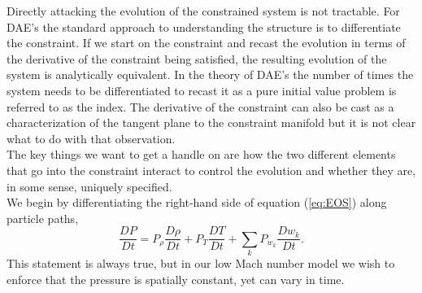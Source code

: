 \documentclass[final]{siamltex}
\begin{document}
Directly attacking the evolution of the constrained system is not tractable.
For DAE's the standard approach to understanding the structure is to differentiate the constraint.
If we start on the constraint and recast the evolution in terms of the derivative of the constraint
being satisfied, the resulting evolution of the system is analytically equivalent.  In the theory
of DAE's the number of times the system needs to be differentiated to recast it as a pure initial
value problem is referred to as the index.
The derivative of the constraint can also be cast as a characterization of the tangent plane to the
constraint manifold but it is not clear what to do with that observation.\\

The key things we want to get a handle on are how the two different elements that go into the
constraint interact to control the evolution and whether they are, in some sense, uniquely specified.\\

We begin by differentiating the 
right-hand side of equation (\ref{eq:EOS}) along particle paths,
\begin{equation}
\frac{DP}{Dt} = P_\rho\frac{D\rho}{Dt} + P_T\frac{DT}{Dt} + \sum_kP_{w_k}\frac{Dw_k}{Dt}.\label{eq:particle paths}
\end{equation}
This statement is always true, but in our low Mach number model we wish to enforce
that the pressure is spatially constant, yet can vary in time.
\end{document}
